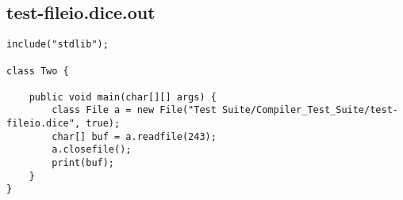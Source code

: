 \subsection{test-fileio.dice.out}
\begin{verbatim}
include("stdlib");

class Two {

	public void main(char[][] args) {
        class File a = new File("Test Suite/Compiler_Test_Suite/test-fileio.dice", true);
        char[] buf = a.readfile(243);
        a.closefile();
        print(buf);
	}
}
\end{verbatim}